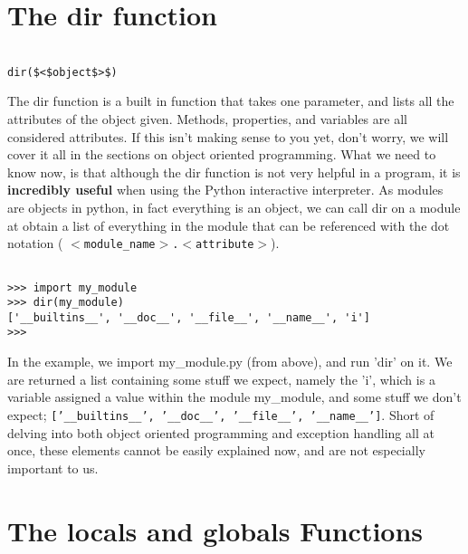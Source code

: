 \section{The dir function}
\begin{lstlisting}

dir($<$object$>$)
\end{lstlisting}

The dir function is a built in function that takes one parameter,   and lists all the attributes of the object given. Methods, properties,   and variables are all considered attributes. If this isn't making sense   to you yet, don't worry, we will cover it all in the sections on object   oriented programming. What we need to know now, is that although the   dir function is not very helpful in a program, it is \textbf{incredibly   useful} when using the Python interactive interpreter. As   modules are objects in python, in fact everything is an object, we can   call dir on a module at obtain a list of everything in the module that   can be referenced with the dot notation   (
\texttt{$<$module\_name$>$.$<$attribute$>$}).
\begin{lstlisting}

>>> import my_module
>>> dir(my_module)
['__builtins__', '__doc__', '__file__', '__name__', 'i']
>>>
\end{lstlisting}

In the example, we import my\_module.py (from above), and run 'dir'   on it. We are returned a list containing some stuff we expect, namely   the 'i', which is a variable assigned a value within the module   my\_module, and some stuff we don't expect; 
\texttt{['\_\_builtins\_\_',   '\_\_doc\_\_', '\_\_file\_\_', '\_\_name\_\_']}. Short of delving into both   object oriented programming and exception handling all at once, these   elements cannot be easily explained now, and are not especially   important to us.

\section{The locals and globals Functions}

